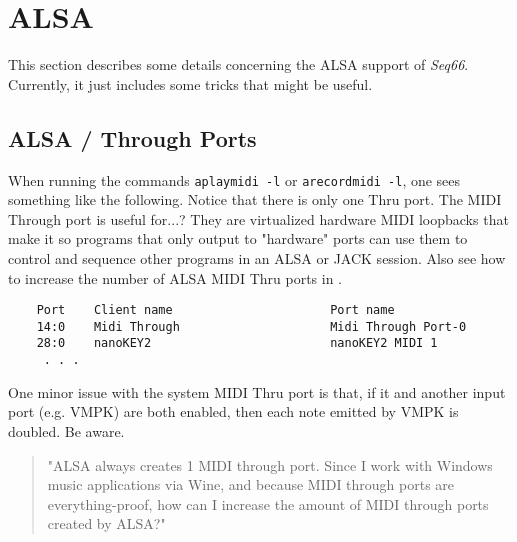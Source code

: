 %
%
%

\section{ALSA}
\label{sec:alsa}

   This section describes some details concerning the ALSA support of
   \textsl{Seq66}.
   Currently, it just includes some tricks that might be useful.

\subsection{ALSA / Through Ports}
\label{subsec:alsa_through_ports}

   When running the commands \texttt{aplaymidi -l} or \texttt{arecordmidi -l},
   one sees something like the following.
   Notice that there is only one Thru port.
   The MIDI Through port is useful for...?
   They are virtualized hardware MIDI loopbacks that make it so
   programs that only output to "hardware" ports can use them
   to control and sequence other programs in an ALSA or JACK session.
   Also see how to increase the number of ALSA MIDI Thru ports in
   \cite{alsathru}.

   \begin{verbatim}
    Port    Client name                      Port name
    14:0    Midi Through                     Midi Through Port-0
    28:0    nanoKEY2                         nanoKEY2 MIDI 1
     . . .
   \end{verbatim}

   One minor issue with the system MIDI Thru port is that, if it and another
   input port (e.g. VMPK) are both enabled, then each note emitted by VMPK is
   doubled. Be aware.

   \begin{quote}
      "ALSA always creates 1 MIDI through port. Since I work with Windows music
      applications via Wine, and because MIDI through ports are
      everything-proof, how can I increase the amount of MIDI through ports
      created by ALSA?"
   \end{quote}

